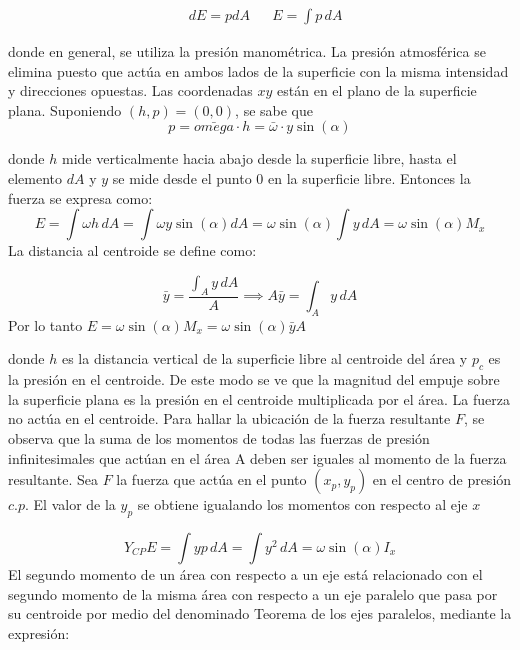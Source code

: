 \begin{align*}
    &dE=pdA&&E=\int p\, dA
\end{align*}

donde en general, se utiliza la presión manométrica. La presión atmosférica se elimina puesto que actúa en ambos lados de la superficie con la misma intensidad y direcciones opuestas. Las coordenadas $xy$ están en el plano de la superficie plana. Suponiendo $(h,p)=(0,0)$, se sabe que
\begin{equation}
    p=\bar{omega}\cdot h=\bar{\omega}\cdot y\sin{(\alpha)}
\end{equation}

donde $h$ mide verticalmente hacia abajo desde la superficie libre, hasta el elemento $dA$ y $y$ se mide desde el punto 0 en la superficie libre. Entonces la fuerza se expresa como: 
\begin{equation*}
    E=\int\omega h\, dA=\int \omega y\sin{(\alpha)} dA=\omega \sin{( \alpha )}\int y\, dA=\omega\sin{( \alpha )} M_x
\end{equation*}
La distancia al centroide se define como: 

\begin{equation*}
    \bar{y}=\frac{\int_A y\, dA}{A}\implies A\bar{y}=\int_A y\, dA
\end{equation*}
Por lo tanto $E=\omega\sin{(\alpha)}M_x=\omega \sin{( \alpha )}\bar{y}A$

donde $h$ es la distancia vertical de la superficie libre al centroide del área y $p_c$ es la presión en el centroide. De este modo se ve que la magnitud del empuje sobre la superficie plana es la presión en el centroide multiplicada por el área. La fuerza no actúa en el centroide.
Para hallar la ubicación de la fuerza resultante $F$, se observa que la suma de los momentos de todas las fuerzas de presión infinitesimales que actúan en el área A deben ser iguales al momento de la fuerza resultante. Sea $F$ la fuerza que actúa en el punto $(x_p,y_p)$ en el centro de presión $c.p$. El valor de la $y_p$ se obtiene igualando los momentos con respecto al eje $x$

\begin{equation*}
    Y_{CP}E=\int yp\, dA=\int y^2\,dA=\omega\sin{(\alpha)}I_x
\end{equation*}
El segundo momento de un área con respecto a un eje está relacionado con el segundo momento de la misma área con respecto a un eje paralelo que pasa por su centroide por medio del denominado Teorema de los ejes paralelos, mediante la expresión: 


